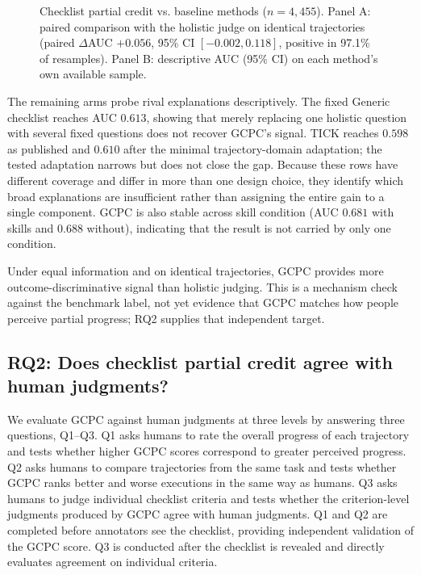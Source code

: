 \documentclass[sigconf,nonacm]{acmart}
\begin{document}
\begin{figure}[t]
{%
}
\caption{Checklist partial credit vs. baseline methods ($n{=}4{,}455$). Panel
A: paired comparison with the holistic judge on identical trajectories
(paired $\Delta$AUC $+0.056$, 95\% CI $[-0.002,0.118]$, positive in 97.1\% of
resamples). Panel B: descriptive AUC (95\% CI) on each method's own available
sample.}
\label{tab:main}
\end{figure}

The remaining arms probe rival explanations descriptively. The fixed Generic
checklist reaches AUC $0.613$, showing that merely replacing one holistic
question with several fixed questions does not recover GCPC's signal. TICK
reaches $0.598$ as published and $0.610$ after the minimal trajectory-domain
adaptation; the tested adaptation narrows but does not close the gap. Because
these rows have different coverage and differ in more than one design choice,
they identify which broad explanations are insufficient rather than assigning
the entire gain to a single component. GCPC is also stable across
skill condition (AUC $0.681$ with skills and $0.688$ without), indicating that
the result is not carried by only one condition.

Under equal information and on identical trajectories, GCPC provides more
outcome-discriminative signal than holistic judging. This is a mechanism
check against the benchmark label, not yet evidence that GCPC matches how
people perceive partial progress; RQ2 supplies that independent target.

\subsection{RQ2: Does checklist partial credit agree with human judgments?}
\label{sec:humaneval}

We evaluate GCPC against human judgments at three levels by answering three questions, Q1--Q3. Q1 asks humans to rate the overall progress
of each trajectory and tests whether higher GCPC scores correspond to greater
perceived progress. Q2 asks humans to compare trajectories from the same task
and tests whether GCPC ranks better and worse executions in the same way as
humans. Q3 asks humans to judge individual checklist criteria and tests whether
the criterion-level judgments produced by GCPC agree with human judgments.
Q1 and Q2 are completed before annotators see the checklist, providing
independent validation of the GCPC score. Q3 is conducted after the checklist
is revealed and directly evaluates agreement on individual criteria.
\end{document}
